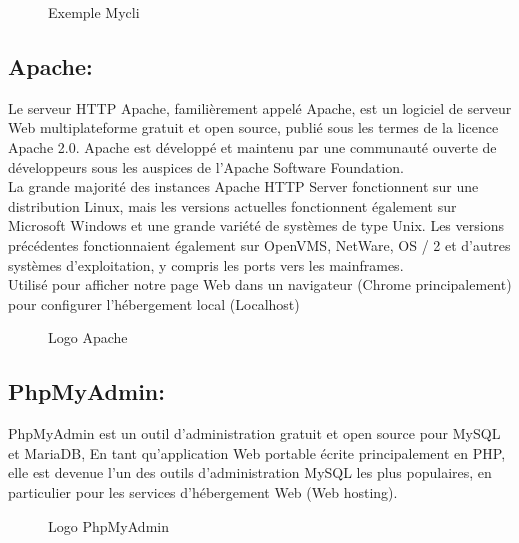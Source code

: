\documentclass[12pt]{report}
\begin{document}
\begin{figure}[h]
\centering
\vspace{-0.1in}
\caption{Exemple Mycli}
\end{figure}

\newpage

\subsection{Apache:}

Le serveur HTTP Apache, familièrement appelé Apache, est un logiciel de serveur Web multiplateforme gratuit et open source, publié sous les termes de la licence Apache 2.0. Apache est développé et maintenu par une communauté ouverte de développeurs sous les auspices de l'Apache Software Foundation.
\\
La grande majorité des instances Apache HTTP Server fonctionnent sur une distribution Linux, mais les versions actuelles fonctionnent également sur Microsoft Windows et une grande variété de systèmes de type Unix. Les versions précédentes fonctionnaient également sur OpenVMS, NetWare, OS / 2 et d'autres systèmes d'exploitation, y compris les ports vers les mainframes.
\\
Utilisé pour afficher notre page Web dans un navigateur (Chrome principalement) pour configurer l'hébergement local (Localhost)

\begin{figure}[h]
\centering
\caption{Logo Apache}
\end{figure}

\subsection{PhpMyAdmin:}

PhpMyAdmin est un outil d'administration gratuit et open source pour MySQL et MariaDB, En tant qu'application Web portable écrite principalement en PHP, elle est devenue l'un des outils d'administration MySQL les plus populaires, en particulier pour les services d'hébergement Web (Web hosting).

\vspace{0.2in}

\begin{figure}[h]
\centering
\caption{Logo PhpMyAdmin}
\end{figure}
\end{document}
